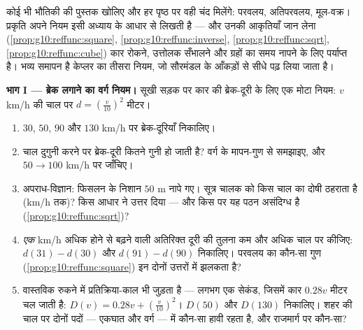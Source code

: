 \begin{problem}
\label{pb:g10:reffunc:1}
कोई भी भौतिकी की पुस्तक खोलिए और हर पृष्ठ पर वही चंद  मिलेंगे: परवलय,
अतिपरवलय, मूल-वक्र। प्रकृति अपने नियम इसी अध्याय के आधार  से लिखती है
--- और उनकी आकृतियाँ जान लेना (\cref{prop:g10:reffunc:square}, \cref{prop:g10:reffunc:inverse}, \cref{prop:g10:reffunc:sqrt}, \cref{prop:g10:reffunc:cube}) कार रोकने,
उत्तोलक सँभालने और ग्रहों का समय नापने के लिए पर्याप्त है। भव्य समापन है
केप्लर का तीसरा नियम, जो सौरमंडल के आँकड़ों से सीधे पढ़ लिया जाता है।

\medskip
\noindent\textbf{भाग I --- ब्रेक लगाने का वर्ग नियम।}
सूखी सड़क पर कार की ब्रेक-दूरी के लिए एक मोटा नियम: $v$ km/h की चाल पर
$d = \left(\frac{v}{10}\right)^{2}$ मीटर।
\begin{enumerate}
  \item $30$, $50$, $90$ और $130$ km/h पर ब्रेक-दूरियाँ निकालिए।
  \item चाल दुगुनी करने पर ब्रेक-दूरी कितने गुनी हो जाती है? वर्ग  के
        मापन-गुण से समझाइए, और $50 \to 100$ km/h पर जाँचिए।
  \item अपराध-विज्ञान: फिसलन के निशान $50$ m नापे गए। सूत्र चालक को
        किस चाल का दोषी ठहराता है (km/h तक)? किस आधार  ने उत्तर दिया
        --- और किस  पर यह पठन असंदिग्ध है (\cref{prop:g10:reffunc:sqrt})?
  \item \emph{एक} km/h अधिक होने से बढ़ने वाली अतिरिक्त दूरी की तुलना
        कम और अधिक चाल पर कीजिए: $d(31) - d(30)$ और $d(91) - d(90)$ निकालिए। परवलय का
        कौन-सा गुण (\cref{prop:g10:reffunc:square}) इन दोनों उत्तरों में झलकता है?
  \item वास्तविक रुकने में प्रतिक्रिया-काल भी जुड़ता है --- लगभग एक सेकंड,
        जिसमें कार $0.28v$ मीटर चल जाती है: $D(v) = 0.28v + \left(\frac{v}{10}\right)^2$। $D(50)$ और $D(130)$
        निकालिए। शहर की चाल पर दोनों पदों --- एकघात और वर्ग --- में
        कौन-सा हावी रहता है, और राजमार्ग पर कौन-सा?
\end{enumerate}


\end{problem}
